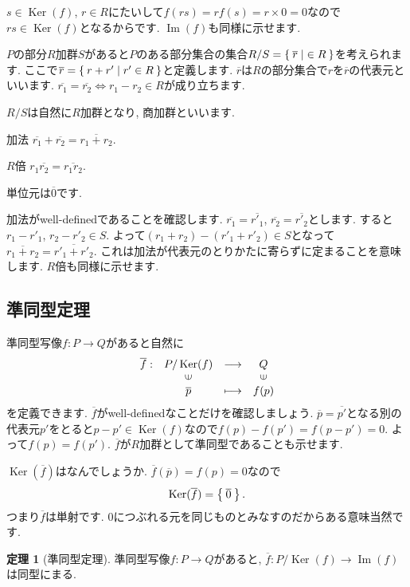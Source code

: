 \documentclass{jsarticle}
\newcommand{\makeop}[1]{\mathop{\mathrm{#1}}\nolimits}
\def\Im{\makeop{Im}}
\def\Ker{\makeop{Ker}}
\theoremstyle{definition}
\newtheorem{theorem}{定理}
\newcommand{\mydescription}[1]{
\begin{description}
\setlength{\itemindent}{2zw}
\setlength{\leftskip}{-2zw}
\setlength{\labelsep}{1zw}
#1
\end{description}
}
\numberwithin{theorem}{section}
\begin{document}
$s \in \Ker(f)$, $r \in R$にたいして$f(rs)=rf(s)=r\times 0=0$なので$rs \in \Ker(f)$となるからです. $\Im(f)$も同様に示せます.

$P$の部分$R$加群$S$があると$P$のある部分集合の集合$R/S=\Set{\overline{r}|\in R}$を考えられます.
ここで$\overline{r}=\Set{r+r'|r'\in R}$と定義します. $\overline{r}$は$R$の部分集合で$r$を$\overline{r}$の代表元といいます.
$\overline{r_1}=\overline{r_2} \iff r_1-r_2 \in R$が成り立ちます.

$R/S$は自然に$R$加群となり, 商加群といいます.
\mydescription{
\item[加法] $\overline{r_1}+\overline{r_2}=\overline{r_1+r_2}$.
\item[$R$倍] $r_1\overline{r_2}=\overline{r_1 r_2}$.
}
単位元は$\overline{0}$です.

加法がwell-definedであることを確認します.
$\overline{r_1}=\overline{r'_1}$, $\overline{r_2}=\overline{r'_2}$とします.
すると$r_1-r'_1$, $r_2-r'_2 \in S$. よって$(r_1+r_2)-(r'_1+r'_2) \in S$となって$\overline{r_1+r_2}=\overline{r'_1+r'_2}$.
これは加法が代表元のとりかたに寄らずに定まることを意味します. $R$倍も同様に示せます.

\subsection{準同型定理}

準同型写像$f: P \rightarrow Q$があると自然に
\[
\begin{array}{cccc}
\overline{f}:& P/\Ker(f)            & \longrightarrow & Q\\
        &\rotatebox{90}{$\in$} &                 & \rotatebox{90}{$\in$} \\
        & \overline{p}              & \longmapsto     & f(p)
\end{array}
\]
を定義できます. $\overline{f}$がwell-definedなことだけを確認しましょう.
$\overline{p}=\overline{p'}$となる別の代表元$p'$をとると$p-p'\in \Ker(f)$なので$f(p)-f(p')=f(p-p')=0$.
よって$f(p)=f(p')$. $\overline{f}$が$R$加群として準同型であることも示せます.

$\Ker(\overline{f})$はなんでしょうか. $\overline{f}(\overline{p})=f(p)=0$なので
\[
\Ker(\overline{f})=\Set{\overline{0}}.
\]
つまり$\overline{f}$は単射です. 0につぶれる元を同じものとみなすのだからある意味当然です.

\begin{theorem}[準同型定理]
準同型写像$f: P \rightarrow Q$があると, $\overline{f}:P/\Ker(f) \rightarrow \Im(f)$は同型にまる.
\end{theorem}
\end{document}
